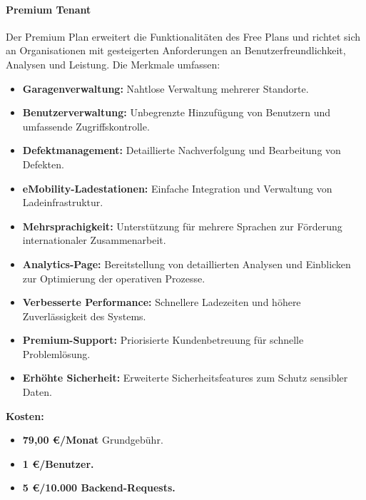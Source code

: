 \paragraph{Premium Tenant}
Der Premium Plan erweitert die Funktionalitäten des Free Plans und richtet sich an Organisationen mit gesteigerten Anforderungen an Benutzerfreundlichkeit, Analysen und Leistung. Die Merkmale umfassen:
\begin{itemize}
    \item \textbf{Garagenverwaltung:} Nahtlose Verwaltung mehrerer Standorte.
    \item \textbf{Benutzerverwaltung:} Unbegrenzte Hinzufügung von Benutzern und umfassende Zugriffskontrolle.
    \item \textbf{Defektmanagement:} Detaillierte Nachverfolgung und Bearbeitung von Defekten.
    \item \textbf{eMobility-Ladestationen:} Einfache Integration und Verwaltung von Ladeinfrastruktur.
    \item \textbf{Mehrsprachigkeit:} Unterstützung für mehrere Sprachen zur Förderung internationaler Zusammenarbeit.
    \item \textbf{Analytics-Page:} Bereitstellung von detaillierten Analysen und Einblicken zur Optimierung der operativen Prozesse.
    \item \textbf{Verbesserte Performance:} Schnellere Ladezeiten und höhere Zuverlässigkeit des Systems.
    \item \textbf{Premium-Support:} Priorisierte Kundenbetreuung für schnelle Problemlösung.
    \item \textbf{Erhöhte Sicherheit:} Erweiterte Sicherheitsfeatures zum Schutz sensibler Daten.
\end{itemize}
\textbf{Kosten:}
\begin{itemize}
    \item \textbf{79,00 €/Monat} Grundgebühr.
    \item \textbf{1 €/Benutzer.}
    \item \textbf{5 €/10.000 Backend-Requests.}
\end{itemize}

